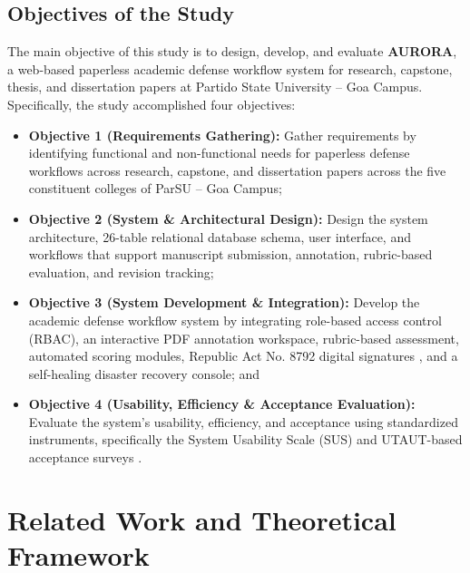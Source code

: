 \documentclass[sigplan,screen,nonacm]{acmart}
\begin{document}
\subsection{Objectives of the Study}
The main objective of this study is to design, develop, and evaluate \textbf{AURORA}, a web-based paperless academic defense workflow system for research, capstone, thesis, and dissertation papers at Partido State University -- Goa Campus. Specifically, the study accomplished four objectives:
\begin{itemize}
  \item \textbf{Objective 1 (Requirements Gathering):} Gather requirements by identifying functional and non-functional needs for paperless defense workflows across research, capstone, and dissertation papers across the five constituent colleges of ParSU -- Goa Campus;
  \item \textbf{Objective 2 (System \& Architectural Design):} Design the system architecture, 26-table relational database schema, user interface, and workflows that support manuscript submission, annotation, rubric-based evaluation, and revision tracking;
  \item \textbf{Objective 3 (System Development \& Integration):} Develop the academic defense workflow system by integrating role-based access control (RBAC), an interactive PDF annotation workspace, rubric-based assessment, automated scoring modules, Republic Act No. 8792 digital signatures \cite{ra8792}, and a self-healing disaster recovery console; and
  \item \textbf{Objective 4 (Usability, Efficiency \& Acceptance Evaluation):} Evaluate the system's usability, efficiency, and acceptance using standardized instruments, specifically the System Usability Scale (SUS) \cite{brooke1996sus} and UTAUT-based acceptance surveys \cite{venkatesh2003user}.
\end{itemize}

\section{Related Work and Theoretical Framework}
\end{document}
